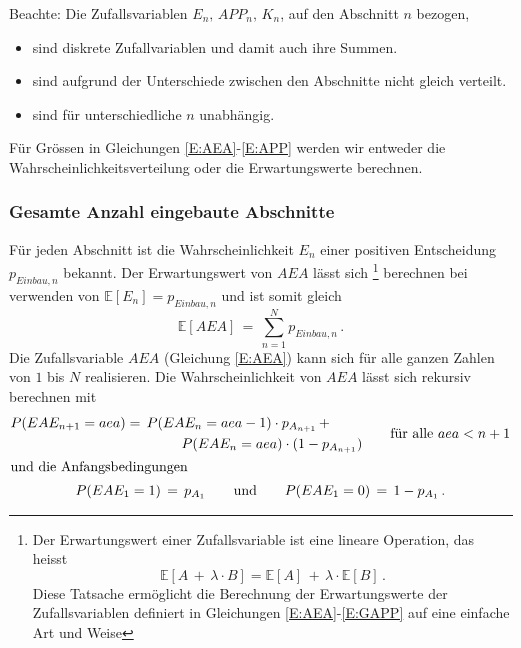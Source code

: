 Beachte: Die Zufallsvariablen $ E_n,\,APP_n,\,K_n$, auf den Abschnitt $n$ bezogen,
\begin{itemize}
\item sind diskrete Zufallvariablen und damit auch ihre Summen.
\item sind aufgrund der Unterschiede zwischen den Abschnitte nicht gleich verteilt.
\item sind für unterschiedliche $n$ unabhängig.
\end{itemize}
Für Grössen in Gleichungen \ref{E:AEA}-\ref{E:APP} werden wir entweder die Wahrscheinlichkeitsverteilung oder die Erwartungswerte berechnen.\\

\subsubsection*{Gesamte Anzahl eingebaute Abschnitte}
Für jeden Abschnitt ist die Wahrscheinlichkeit $E_n$ einer positiven Entscheidung $p_{Einbau,n}$  bekannt. Der Erwartungswert von $AEA$ lässt sich \footnote{Der Erwartungswert einer Zufallsvariable ist eine lineare Operation, das heisst 
\begin{equation*}
\mathbb{E}\left[A\,+\,\lambda\cdot B\right]= \mathbb{E}[ A] \,+ \,\lambda\cdot \mathbb{E}[B]\,.
\end{equation*}
Diese Tatsache ermöglicht die Berechnung der Erwartungswerte der Zufallsvariablen definiert in Gleichungen \ref{E:AEA}-\ref{E:GAPP} auf eine einfache Art und Weise
}
berechnen bei verwenden von $\mathbb{E}[ E_n]=p_{Einbau,n}$  und ist somit gleich
\begin{equation*}
	\mathbb{E}[AEA]\,=\,\sum_{n=1}^{N} p_{Einbau,n} \,.
\end{equation*}
Die Zufallsvariable $AEA$ (Gleichung \ref{E:AEA}) kann sich für alle ganzen Zahlen von $1$ bis $N$ realisieren. Die Wahrscheinlichkeit von $AEA$ lässt sich rekursiv berechnen mit
\begin{gather*}
	\begin{aligned}
		P(EAE_{n+1}=aea)&=\, P(EAE_{n}=aea-1)\cdot p_{A_{n+1}} \, +\\
		&\qquad\qquad  P(EAE_{n}=aea)\cdot (1-p_{A_{n+1}})
	\end{aligned}
	\qquad \text{für alle $aea<n+1$}\\
	\intertext{und die Anfangsbedingungen}
	P(EAE_{1}=1)\,= \, p_{A_{1}} \qquad\text{und}\qquad P(EAE_{1}=0) \,=\, 1-p_{A_{1}}\,. 
\end{gather*}

